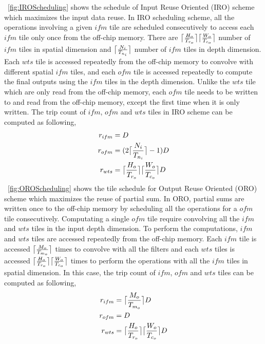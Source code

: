  \figurename~\ref{fig:IROScheduling} shows the schedule of Input Reuse Oriented (IRO) scheme which maximizes the input data reuse. In IRO scheduling scheme, all the operations involving a given $ifm$ tile are scheduled consecutively to access each $ifm$ tile only once from the off-chip memory. There are $\ceil[\big]{\frac{H_o}{T_{r_o}}}\ceil[\big]{\frac{W_o}{T_{c_o}}}$ number of $ifm$ tiles in spatial dimension and $\ceil[\big]{\frac{N_i}{T_{n_i}}}$ number of $ifm$ tiles in depth dimension. Each $wts$ tile is accessed repeatedly from the off-chip memory to convolve with different spatial $ifm$ tiles, and each $ofm$ tile is accessed repeatedly to compute the final outputs using the $ifm$ tiles in the depth dimension. Unlike the $wts$ tile which are only read from the off-chip memory, each $ofm$ tile needs to be written to and read from the off-chip memory, except the first time when it is only written. The trip count of $ifm$, $ofm$ and $wts$ tiles in IRO scheme can be computed as following,
\begin{align}\label{eq:IROTripCount}
	\begin{split}
	r_{ifm} &= D \\
	r_{ofm}&= (2\ceil[\big]{\frac{N_i}{T_{n_i}}}-1)D \\
	r_{wts} &= \ceil[\big]{\frac{H_o}{T_{r_o}}}\ceil[\big]{\frac{W_o}{T_{c_o}}}D
	\end{split}
\end{align}
\figurename~\ref{fig:OROScheduling} shows the tile schedule for Output Reuse Oriented (ORO) scheme which maximizes the reuse of partial sum. In ORO, partial sums are written once to the off-chip memory by scheduling all the operations for a $ofm$ tile consecutively. Computating a single $ofm$ tile require convolving all the $ifm$ and $wts$ tiles in the input depth dimension. To perform the computations, $ifm$ and $wts$ tiles are accessed repeatedly from the off-chip memory. Each $ifm$ tile is accessed $\ceil[\big]{\frac{M_o}{T_{m_o}}}$ times to convolve with all the filters and each $wts$ tiles is accessed $\ceil[\big]{\frac{H_o}{T_{r_o}}}\ceil[\big]{\frac{W_o}{T_{c_o}}}$ times to perform the operations with all the $ifm$ tiles in spatial dimension. In this case, the trip count of $ifm$, $ofm$ and $wts$ tiles can be computed as following,
\begin{align}\label{eq:OROTripCount}
	\begin{split}
		r_{ifm} &= \ceil[\big]{\frac{M_o}{T_{m_o}}}D \\
		r_{ofm}&= D \\
		r_{wts} &= \ceil[\big]{\frac{H_o}{T_{r_o}}}\ceil[\big]{\frac{W_o}{T_{c_o}}} D
	\end{split}
\end{align}
